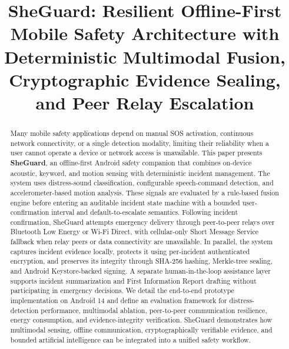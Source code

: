 \documentclass[conference]{IEEEtran}
\begin{document}
\title{SheGuard: Resilient Offline-First Mobile Safety Architecture with Deterministic Multimodal Fusion, Cryptographic Evidence Sealing, and Peer Relay Escalation}

\author{
\and
{}
}

\maketitle

\begin{abstract}
Many mobile safety applications depend on manual SOS activation, continuous network connectivity, or a single detection modality, limiting their reliability when a user cannot operate a device or network access is unavailable. This paper presents \textbf{SheGuard}, an offline-first Android safety companion that combines on-device acoustic, keyword, and motion sensing with deterministic incident management. The system uses distress-sound classification, configurable speech-command detection, and accelerometer-based motion analysis. These signals are evaluated by a rule-based fusion engine before entering an auditable incident state machine with a bounded user-confirmation interval and default-to-escalate semantics. Following incident confirmation, SheGuard attempts emergency delivery through peer-to-peer relays over Bluetooth Low Energy or Wi-Fi Direct, with cellular-only Short Message Service fallback when relay peers or data connectivity are unavailable. In parallel, the system captures incident evidence locally, protects it using per-incident authenticated encryption, and preserves its integrity through SHA-256 hashing, Merkle-tree sealing, and Android Keystore-backed signing. A separate human-in-the-loop assistance layer supports incident summarization and First Information Report drafting without participating in emergency decisions. We detail the end-to-end prototype implementation on Android 14 and define an evaluation framework for distress-detection performance, multimodal ablation, peer-to-peer communication resilience, energy consumption, and evidence-integrity verification. SheGuard demonstrates how multimodal sensing, offline communication, cryptographically verifiable evidence, and bounded artificial intelligence can be integrated into a unified safety workflow.
\end{abstract}
\end{document}
